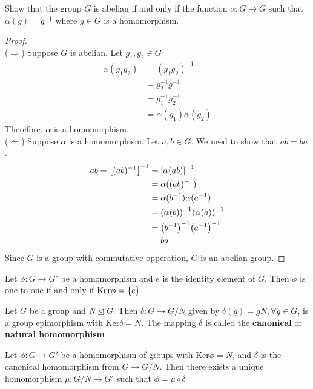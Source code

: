 \begin{exercise}
    Show that the group $G$ is abelian if and only if the function $\alpha : G \to G$ such that $\alpha (g) = g^{-1}$ where $g \in G$ is a homomorphism.
\end{exercise}

\begin{proof} \phantom{blank} \\
    ($\Rightarrow$) Suppose $G$ is abelian. Let $g_1, g_2 \in G$
    \begin{align*}
        \alpha(g_1g_2) &= (g_1 g_2)^{-1} \\
        &= g_2^{-1} g_1^{-1}  \\
        &= g_1^{-1} g_2^{-1} \\
        &= \alpha(g_1)\alpha(g_2)
    \end{align*}
    Therefore, $\alpha$ is a homomorphism. \\
    ($\Leftarrow$) Suppose $\alpha$ is a homomorphism. Let $a, b \in G$. We need to show that $ab = ba$.
    \begin{align*}
        ab = \qty[(ab)^{-1}]^{-1} &= \qty[\alpha(ab)]^{-1} \\
        &= \alpha((ab)^{-1}) \\
        &= \alpha(b^{-1}) \alpha(a^{-1}) \\
        &= \qty(\alpha(b))^{-1} \qty(\alpha(a))^{-1} \\
        &= \qty(b^{-1})^{-1} \qty(a^{-1})^{-1} \\
        &= ba
    \end{align*}
    Since $G$ is a group with commutative opperation, $G$ is an abelian group. \qedsymbol
\end{proof}

\begin{theorem}
    Let $\phi : G \to  G'$ be a homomorphism and $e$ is the identity element of $G$. Then $\phi$ is one-to-one if and only if $\text{Ker} \phi = \qty{e}$
\end{theorem}

\begin{theorem}
    Let $G$ be a group and $N \unlhd G$. Then $\delta : G \to G / N$ given by $\delta(g) = gN, \forall g \in G$, is a group epimorphism with Ker$\delta = N$. The mapping $\delta$ is called the \textbf{canonical} or \textbf{natural homomorphism} 
\end{theorem}

\begin{theorem}
    Let $\phi : G \to G'$ be a homomorphism of groups with Ker$\phi = N$, and $\delta$ is the canonical homomorphism from $G \to G / N$. Then there exists a unique homomorphism $\mu : G / N \to G'$ such that $\phi = \mu \circ \delta$
\end{theorem}

